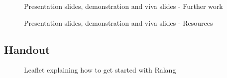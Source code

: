 \documentclass[a4paper]{article}
\begin{document}
\begin{appendices}
\begin{figure}[h!]
		\caption{Presentation slides, demonstration and viva slides - Further work}
	\end{figure}
	\begin{figure}[h!]
		\caption{Presentation slides, demonstration and viva slides - Resources}
	\end{figure}
	\newpage
	\subsection{Handout}
	\begin{figure}[h!]
		\caption{Leaflet explaining how to get started with Ralang}
	\end{figure}
	\end{appendices}
\end{document}
